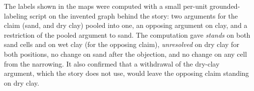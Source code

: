 \documentclass[11pt]{article}
\begin{document}
The labels shown in the maps were computed with a small per-unit grounded-labeling script on the invented graph behind the story: two arguments for the claim (sand, and dry clay) pooled into one, an opposing argument on clay, and a restriction of the pooled argument to sand. The computation gave \emph{stands} on both sand cells and on wet clay (for the opposing claim), \emph{unresolved} on dry clay for both positions, no change on sand after the objection, and no change on any cell from the narrowing. It also confirmed that a withdrawal of the dry-clay argument, which the story does not use, would leave the opposing claim standing on dry clay.
\end{document}

